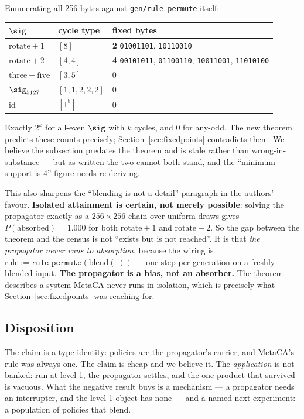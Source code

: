 Enumerating all 256 bytes against \texttt{gen/rule-permute} itself:
\begin{center}
\begin{tabular}{lll}
\toprule
$\sig$ & cycle type & fixed bytes \\
\midrule
$\mathrm{rotate}{+}1$ & $[8]$          & \textbf{2} \quad \texttt{01001101}, \texttt{10110010} \\
$\mathrm{rotate}{+}2$ & $[4,4]$        & \textbf{4} \quad \texttt{00101011}, \texttt{01100110}, \texttt{10011001}, \texttt{11010100} \\
$\mathrm{three{+}five}$ & $[3,5]$      & 0 \\
$\sig_{5127}$ & $[1,1,2,2,2]$          & 0 \\
$\mathrm{id}$ & $[1^8]$                & 0 \\
\bottomrule
\end{tabular}
\end{center}
Exactly $2^{k}$ for all-even $\sig$ with $k$ cycles, and $0$ for any-odd. The new
theorem predicts these counts precisely; Section~\ref{sec:fixedpoints} contradicts
them. We believe the subsection predates the theorem and is stale rather than
wrong-in-substance --- but as written the two cannot both stand, and the
``minimum support is 4'' figure needs re-deriving.

This also sharpens the ``blending is not a detail'' paragraph in the authors'
favour. \textbf{Isolated attainment is certain, not merely possible}: solving the
propagator exactly as a $256 \times 256$ chain over uniform draws gives
$P(\text{absorbed}) = 1.000$ for both $\mathrm{rotate}{+}1$ and
$\mathrm{rotate}{+}2$. So the gap between the theorem and the census is not
``exists but is not reached''. It is that \emph{the propagator never runs to
absorption}, because the wiring is
$\mathrm{rule} := \texttt{rule-permute}(\mathrm{blend}(\cdot))$ --- one step per
generation on a freshly blended input. \textbf{The propagator is a bias, not an
absorber.} The theorem describes a system MetaCA never runs in isolation, which is
precisely what Section~\ref{sec:fixedpoints} was reaching for.

\subsection{Disposition}

The claim is a type identity: policies are the propagator's carrier, and MetaCA's
rule was always one. The claim is cheap and we believe it. The \emph{application}
is not banked: run at level 1, the propagator settles, and the one product that
survived is vacuous. What the negative result buys is a mechanism --- a propagator
needs an interrupter, and the level-1 object has none --- and a named next
experiment: a population of policies that blend.
